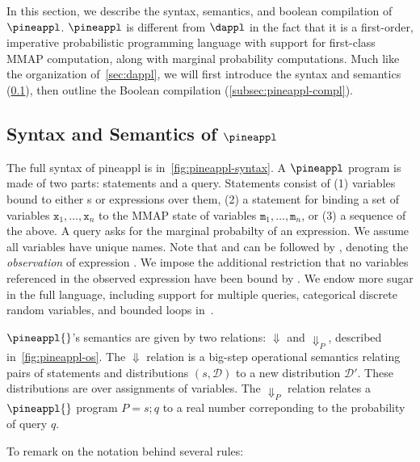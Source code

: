 
In this section, we describe the syntax, semantics, and boolean compilation of
$\pineappl$. $\pineappl$ is
different from $\dappl$ in the fact that it is
a first-order, imperative probabilistic programming
language with support for first-class MMAP computation, along with
marginal probability computations.
Much like the organization of~\cref{sec:dappl},
we will first introduce the syntax and semantics (\cref{subsec:pineappl-sem}),
then outline the Boolean compilation (\cref{subsec:pineappl-compl}).

\subsection{Syntax and Semantics of $\pineappl$}
\label{subsec:pineappl-sem}



The full syntax of pineappl is in~\cref{fig:pineappl-syntax}.  A $\pineappl$
program is made of two parts: statements and a query.  Statements consist of
(1) variables bound to either s or expressions over them,
(2) a  statement for binding a set of variables
$\texttt{x}_1, \hdots, \texttt{x}_n$
to the MMAP state of variables $\texttt{m}_1, \hdots, \texttt{m}_n$, or
(3) a sequence of the above.
A query asks for the marginal probabilty of an
expression.
We assume all variables have unique names.
Note that
 and  can be followed by ,
denoting the \textit{observation} of expression .
We impose the additional restriction that no variables referenced in the observed
expression have been bound by .
We endow more sugar in the full language, including support for
multiple queries, categorical discrete random variables, and bounded loops
in~\citet{cho2025scaling}.




$\pineappl{}$'s semantics are given by two relations: $\Downarrow$ and $\Downarrow_P$,
described in~\cref{fig:pineappl-os}.
The
$\Downarrow$ relation is a big-step operational semantics
relating pairs of statements and distributions $(s, \mathcal D)$
to a new distribution $\mathcal D'$.
These distributions are over assignments of variables.
The
$\Downarrow_P$ relation relates a $\pineappl{}$ program $P = s; q$
to a real number correponding to the probability of query $q$.


To remark on the notation behind several rules:

